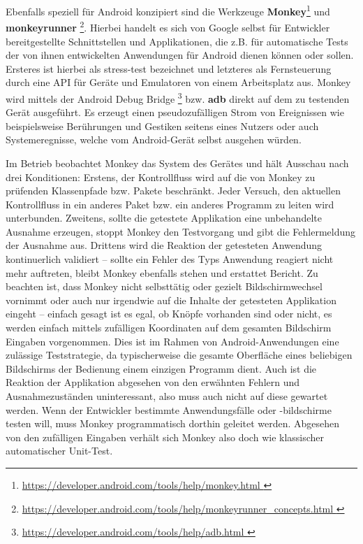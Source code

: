 Ebenfalls speziell für Android konzipiert sind die Werkzeuge
\textbf{Monkey}\footnote{ \url{ https://developer.android.com/tools/help/monkey.html }}
und \textbf{monkeyrunner}
\footnote{ \url{ https://developer.android.com/tools/help/monkeyrunner_concepts.html }}.
Hierbei handelt es sich von Google selbst für Entwickler bereitgestellte
Schnittstellen und Applikationen, die z.B. für automatische Tests 
der von ihnen entwickelten Anwendungen für Android dienen können oder sollen.
Ersteres ist hierbei als \glqq{}stress-test\grqq{} bezeichnet und letzteres
als \glqq{}Fernsteuerung durch eine API für Geräte und Emulatoren von 
einem Arbeitsplatz aus\grqq{}. Monkey wird mittels der Android Debug Bridge
\footnote{ \url{ https://developer.android.com/tools/help/adb.html }}
bzw. \textbf{adb} direkt auf dem zu testenden Gerät ausgeführt. Es erzeugt
einen pseudozufälligen Strom von Ereignissen wie beispielsweise
Berührungen und Gestiken seitens eines Nutzers oder auch Systemeregnisse,
welche vom Android-Gerät selbst ausgehen würden.

Im Betrieb beobachtet Monkey das System
des Gerätes und hält Ausschau nach drei Konditionen: Erstens, der
Kontrollfluss wird auf die von Monkey zu prüfenden Klassenpfade bzw.
Pakete beschränkt. Jeder Versuch, den aktuellen Kontrollfluss in ein
anderes Paket bzw. ein anderes Programm zu leiten wird unterbunden.
Zweitens, sollte die getestete Applikation eine unbehandelte Ausnahme
erzeugen, stoppt Monkey den Testvorgang und gibt die Fehlermeldung der
Ausnahme aus. Drittens wird die Reaktion der getesteten Anwendung
kontinuerlich validiert -- sollte ein Fehler des Typs \glqq{}Anwendung
reagiert nicht mehr\grqq{} auftreten, bleibt Monkey ebenfalls stehen
und erstattet Bericht. Zu beachten ist, dass Monkey nicht selbsttätig
oder gezielt Bildschirmwechsel vornimmt oder auch nur irgendwie
auf die Inhalte der getesteten Applikation eingeht -- einfach gesagt ist es egal,
ob Knöpfe vorhanden sind oder nicht, es werden einfach 
mittels zufälligen Koordinaten auf dem gesamten Bildschirm Eingaben 
vorgenommen. Dies ist im Rahmen von Android-Anwendungen
eine zulässige Teststrategie, da typischerweise die gesamte Oberfläche
eines beliebigen Bildschirms der Bedienung einem einzigen Programm dient.
Auch ist die Reaktion der Applikation abgesehen von den erwähnten
Fehlern und Ausnahmezuständen uninteressant, also muss auch nicht auf
diese gewartet werden. Wenn der Entwickler bestimmte Anwendungsfälle
oder -bildschirme testen will, muss Monkey programmatisch dorthin
geleitet werden. Abgesehen von den zufälligen Eingaben verhält sich
Monkey also doch wie klassischer automatischer Unit-Test.

